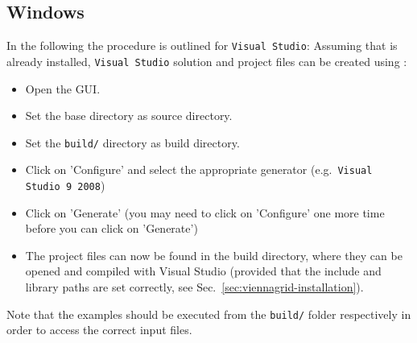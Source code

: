\subsection{Windows}
In the following the procedure is outlined for \texttt{Visual Studio}: Assuming
that {\CMake} is already installed, \texttt{Visual Studio} solution
and project files can be created using {\CMake}:
\begin{itemize}
\item Open the {\CMake} GUI.
\item Set the {\ViennaGrid} base directory as source directory.
\item Set the \texttt{build/} directory as build directory.
\item Click on 'Configure' and select the appropriate generator
(e.g.~\texttt{Visual Studio 9 2008})
\item Click on 'Generate' (you may need to click on 'Configure' one more time
before you can click on 'Generate')
\item The project files can now be found in the {\ViennaGrid} build directory,
where they can be opened and compiled with Visual Studio (provided that the
include and library paths are set correctly, see
Sec.~\ref{sec:viennagrid-installation}).
\end{itemize}

Note that the examples should be executed from the \texttt{build/} folder respectively in order to access the correct input files.

